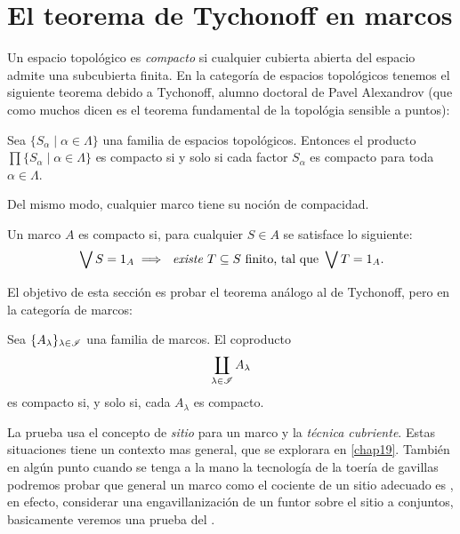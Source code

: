 \section{El teorema de Tychonoff en marcos}

Un espacio topológico es  \emph{compacto} si cualquier cubierta
abierta del espacio admite una subcubierta finita.
En la categoría de espacios topológicos tenemos el siguiente 
teorema debido a Tychonoff, alumno doctoral de Pavel Alexandrov (que
como muchos dicen es el teorema fundamental de la topológia sensible a
puntos):

\begin{theorem}
  Sea $\{S_{\alpha}\mid\alpha\in\Lambda\}$ una familia de espacios topológicos. Entonces
  el producto $\prod\{S_{\alpha}\mid\alpha\in\Lambda\}$ es compacto si
  y solo si cada factor $S_{\alpha}$ es compacto para toda
  $\alpha\in\Lambda$.
\end{theorem}

Del mismo modo, cualquier marco tiene su noción de compacidad.
\begin{definition}
Un marco $A$ es compacto si, para cualquier $S\in A$
se satisface lo siguiente:
\[
    \bigvee S= 1_A
    \implies
    \textit{ existe } T\subseteq S\text{ finito, tal que }
    \bigvee T= 1_A
.\]
\end{definition}
El objetivo de esta sección es probar el teorema análogo
al de Tychonoff, pero en la categoría de marcos:
\begin{theorem}
    Sea $\{A_\lambda\}_{\lambda\in\mathscr{I}}$ una familia de marcos.
    El coproducto
    \[
        \coprod_{\lambda\in\mathscr{I}}A_\lambda
    \]
    es compacto si, y solo si, cada $A_\lambda$ es compacto.
\end{theorem}

La prueba usa el concepto de \emph{sitio} para un marco y la
\emph{técnica cubriente}. Estas situaciones tiene un contexto mas
general, que se explorara en \ref{chap19}. También
en algún punto cuando se tenga a la mano la tecnología de la toería de
gavillas podremos probar que general un marco como el cociente de un
sitio adecuado es , en efecto, considerar una engavillanización de un
funtor sobre el sitio a conjuntos, basicamente veremos una prueba del
\cite[Lemma V.1.7]{johnstone1986stone}.

